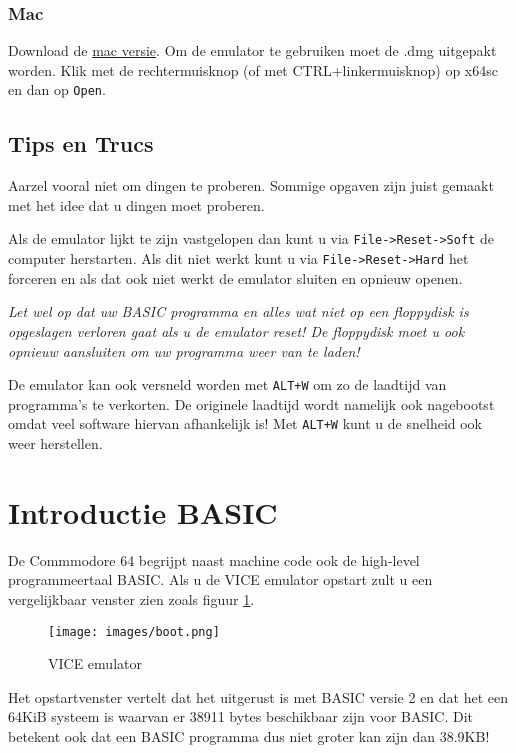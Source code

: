 \documentclass{article}
\begin{document}
\subsubsection{Mac}
Download de \href{http://sourceforge.net/projects/vice-emu/files/releases/binaries/macosx/vice-macosx-cocoa-x86_64-10.12-3.1.dmg/download}{mac versie}.
Om de emulator te gebruiken moet de .dmg uitgepakt worden.
Klik met de rechtermuisknop (of met CTRL+linkermuisknop) op x64sc en dan op \verb:Open:.

\subsection{Tips en Trucs}

Aarzel vooral niet om dingen te proberen.
Sommige opgaven zijn juist gemaakt met het idee dat u dingen moet proberen.

Als de emulator lijkt te zijn vastgelopen dan kunt u via \verb:File->Reset->Soft: de computer herstarten.
Als dit niet werkt kunt u via \verb:File->Reset->Hard: het forceren en als dat ook niet werkt de emulator sluiten en opnieuw openen.

\emph{Let wel op dat uw BASIC programma en alles wat niet op een floppydisk is opgeslagen verloren gaat als u de emulator reset!
De floppydisk moet u ook opnieuw aansluiten om uw programma weer van te laden!}

De emulator kan ook versneld worden met \verb:ALT+W: om zo de laadtijd van programma's te verkorten.
De originele laadtijd wordt namelijk ook nagebootst omdat veel software hiervan afhankelijk is!
Met \verb:ALT+W: kunt u de snelheid ook weer herstellen.



\section{Introductie BASIC}

De Commmodore 64 begrijpt naast machine code ook de high-level programmeertaal BASIC.
Als u de VICE emulator opstart zult u een vergelijkbaar venster zien zoals figuur \ref{fig:vice}.

\begin{figure}
\centering
\texttt{[image: images/boot.png]}
\caption{VICE emulator}
\label{fig:vice}
\end{figure}

Het opstartvenster vertelt dat het uitgerust is met BASIC versie 2 en dat het een 64KiB systeem is waarvan er 38911 bytes beschikbaar zijn voor BASIC.
Dit betekent ook dat een BASIC programma dus niet groter kan zijn dan 38.9KB!
\end{document}
